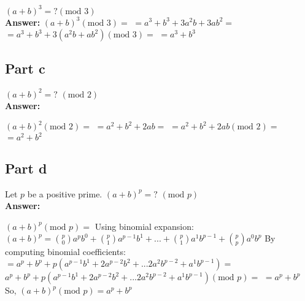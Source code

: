 \documentclass[12pt]{article}
\begin{document}
$(a+b)^{3}=? (\text{mod }3)$\\

{\noindent\bf Answer:}
{
$(a+b)^{3}(\text{mod }3)=$\newline
$=a^{3}+b^{3}+3a^{2}b+3ab^{2}=$\newline
$=a^{3}+b^{3}+3(a^{2}b+ab^{2})(\text{mod }3)=$\newline
$= a^{3}+b^{3}$
}

\subsection*{Part c}

$(a+b)^{2}=\text{? }(\text{mod }2)$\\

{\noindent\bf Answer:}

{
$(a+b)^{2}(\text{mod }2)=$\newline
$=a^{2}+b^{2}+2ab=$\newline
$=a^{2}+b^{2}+2ab (\text{mod }2)=$\newline
$= a^{2}+b^{2}$


}

\subsection*{Part d}

Let $p$ be a positive prime. $(a+b)^{p}=\text{? }(\text{mod }p)$\\

{\noindent\bf Answer:}
{
$(a+b)^{p}(\text{mod }p)=$\newline
Using binomial expansion:\newline
$(a+b)^{p}=\binom{p}{0}a^{p}b^{0}+\binom{p}{1}a^{p-1}b^{1}+...+\binom{p}{1}a^{1}b^{p-1}+\binom{p}{p}a^{0}b^{p}$\newline
 \newline
By computing binomial coefficients:\newline
$=a^{p}+b^{p}+p(a^{p-1}b^{1}+2a^{p-2}b^{2}+...2a^{2}b^{p-2}+a^{1}b^{p-1})=$\newline
$a^{p}+b^{p}+p(a^{p-1}b^{1}+2a^{p-2}b^{2}+...2a^{2}b^{p-2}+a^{1}b^{p-1})(\text{mod }p)=$\newline
$=a^{p}+b^{p}$\newline
So, $(a+b)^{p}(\text{mod }p)=a^{p}+b^{p}$\newline

}
\end{document}
